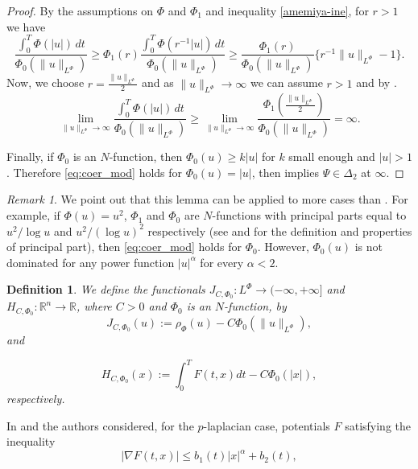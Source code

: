 \documentclass[twoside]{article}
\newtheorem{defi}[thm]{Definition}
\theoremstyle{remark}
\newtheorem{comentario}{Remark}
\newcommand{\orlnor}{\|_{L^{\Phi}}}
\newcommand{\lphi}{L^{\Phi}}
\newcommand{\rr}{\mathbb{R}}
\renewcommand{\leq}{\leqslant}
\renewcommand{\geq}{\geqslant}
\begin{document}
\begin{proof}
By the assumptions on $\Phi$ and $\Phi_1$  and  inequality \eqref{amemiya-ine}, for $r>1$ we have 
\[
\frac{\int_0^T \Phi(|u|)\,dt}{\Phi_0(\|u\orlnor)}\geq
\Phi_1(r) \frac{\int_0^T \Phi(r^{-1}|u|)\,dt}{\Phi_0(\|u\orlnor)}\geq
\frac{\Phi_1(r)}{\Phi_0(\|u\orlnor)}\{r^{-1}\|u\orlnor-1\}.
\]
Now, we choose $r=\frac{\|u\orlnor}{2}$ and as $\|u\orlnor\to\infty$ we can assume $r>1$ and by \cite[Thm. 2 (b), p. 16]{rao1991theory}.
\[
\lim\limits_{\|u\orlnor \to \infty} \frac{\int_0^T \Phi(|u|)\,dt}{\Phi_0(\|u\orlnor)}\geq
\lim\limits_{\|u\orlnor \to \infty} \frac{\Phi_1\left(\frac{\|u\orlnor}{2}\right)}{\Phi_0(\|u\orlnor)}
=\infty.
\]




Finally, if $\Phi_0$ is an $N$-function, then $\Phi_0(u)\geq k|u|$ for  $k$ small enough and $|u|>1$. 
Therefore \eqref{eq:coer_mod} holds for $\Phi_0(u)=|u|$, then \cite[Lemma 5.2]{ABGMS2015}  implies  $\Psi\in\Delta_2$ at $\infty$.
\end{proof}


\begin{comentario}  We point out that this lemma can be applied to more cases than \cite[Lemma 5.2]{ABGMS2015}. For example, if $\Phi(u)=u^2$, $\Phi_1$ and $\Phi_0$ are  $N$-functions with principal parts equal to $u^2/\log u$ and $u^2/(\log u)^2$ respectively (see \cite[p. 16]{KR} and \cite[Sec. 7]{KR} for the definition and properties of principal part), then  \eqref{eq:coer_mod} holds for $\Phi_0$.
However, $\Phi_0(u)$ is not dominated for any  power function $|u|^{\alpha}$ for every $\alpha<2$. 
\end{comentario}






\begin{defi}We define the  functionals $J_{C,\Phi_0}:\lphi\to (-\infty,+\infty]$ and $  H_{C,\Phi_0}:\rr^n\to \rr$, where $C>0$ and $\Phi_0$ is an $N$-function, by
\begin{equation}\label{func_phi}
  J_{C,\Phi_0}(u):= \rho_{\Phi}\left(u\right)-C\Phi_0\left(\|u\orlnor\right),
\end{equation}
 and

\begin{equation}\label{eq:functional_H-bis}
 H_{C,\Phi_0}(x):=\int_0^TF(t,x)dt-C\Phi_0(|x|),
\end{equation}
respectively.
\end{defi}

In \cite{tang1998periodic} and \cite{tang2010periodic} the authors  considered, for the $p$-laplacian case, potentials $F$ satisfying the inequality
\begin{equation}\label{eq:cota_pot} |\nabla F(t,x)|\leq b_1(t)|x|^{\alpha}+b_2(t),
 \end{equation}
\end{document}
